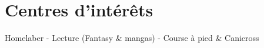 \documentclass[]{friggeri-cv}
\begin{document}
\section{Centres d'intérêts}
\vspace{-5pt}
\begin{entrylist}
  \entry
    {Homelaber - Lecture (Fantasy \& mangas) - Course à pied \& Canicross}
    {}    {}    {}
\end{entrylist}
\end{document}

